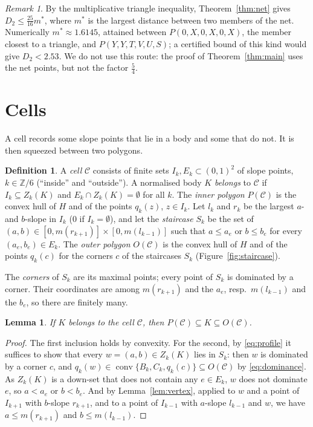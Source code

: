 \documentclass[11pt]{amsart}
\newtheorem{lemma}[theorem]{Lemma}
\theoremstyle{definition}
\newtheorem{definition}[theorem]{Definition}
\theoremstyle{remark}
\newtheorem{remark}[theorem]{Remark}
\DeclareMathOperator{\conv}{conv}
\newcommand{\C}{\mathcal C}
\begin{document}
\begin{remark}
By the multiplicative triangle inequality, Theorem~\ref{thm:net} gives $D_2\le\frac{25}{16}m^*$, where $m^*$ is the largest
distance between two members of the net. Numerically $m^*\approx1.6145$, attained between $P(0,X,0,X,0,X)$, the member closest
to a triangle, and $P(Y,Y,T,V,U,S)$; a certified bound of this kind would give $D_2<2.53$. We do not use this route: the
proof of Theorem~\ref{thm:main} uses the net points, but not the factor $\frac54$.
\end{remark}

\section{Cells}\label{sec:cells}

A cell records some slope points that lie in a body and some that do not. It is then squeezed between two polygons.

\begin{definition}\label{def:cell}
A \emph{cell} $\C$ consists of finite sets $I_k,E_k\subset(0,1)^2$ of slope points, $k\in\mathbb Z/6$ (``inside'' and
``outside''). A normalised body $K$ \emph{belongs} to $\C$ if $I_k\subseteq Z_k(K)$ and $E_k\cap Z_k(K)=\emptyset$ for all $k$.
The \emph{inner polygon} $P(\C)$ is the convex hull of $H$ and of the points $q_k(z)$, $z\in I_k$. Let $l_k$ and $r_k$ be the
largest $a$- and $b$-slope in $I_k$ ($0$ if $I_k=\emptyset$), and let the \emph{staircase} $S_k$ be the set of
$(a,b)\in[0,m(r_{k+1})]\times[0,m(l_{k-1})]$ such that $a\le a_e$ or $b\le b_e$ for every $(a_e,b_e)\in E_k$. The
\emph{outer polygon} $O(\C)$ is the convex hull of $H$ and of the points $q_k(c)$ for the corners $c$ of the staircases
$S_k$ (Figure~\ref{fig:staircase}).
\end{definition}

The \emph{corners} of $S_k$ are its maximal points; every point of $S_k$ is dominated by a corner. Their coordinates
are among $m(r_{k+1})$ and the $a_e$, resp.\ $m(l_{k-1})$ and the $b_e$, so there are finitely many.

\begin{lemma}\label{lem:cell}
If $K$ belongs to the cell $\C$, then $P(\C)\subseteq K\subseteq O(\C)$.
\end{lemma}

\begin{proof}
The first inclusion holds by convexity. For the second, by \eqref{eq:profile} it suffices to show that every
$w=(a,b)\in Z_k(K)$ lies in $S_k$: then $w$ is dominated by a corner $c$, and $q_k(w)\in\conv\{B_k,C_k,q_k(c)\}\subseteq O(\C)$
by \eqref{eq:dominance}. As $Z_k(K)$ is a down-set that does not contain any $e\in E_k$, $w$ does not dominate $e$, so
$a<a_e$ or $b<b_e$. And by Lemma~\ref{lem:vertex}, applied to $w$ and a point of $I_{k+1}$ with $b$-slope $r_{k+1}$, and to a point of
$I_{k-1}$ with $a$-slope $l_{k-1}$ and $w$, we have $a\le m(r_{k+1})$ and $b\le m(l_{k-1})$.
\end{proof}
\end{document}
